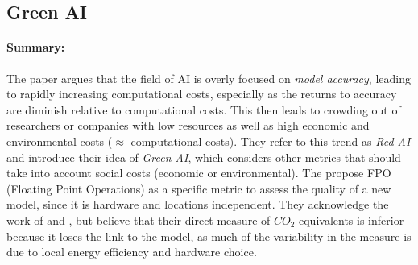 \documentclass[a4paper, 12pt]{article}
\begin{document}
\subsection{Green AI}
\centerline{}
\vspace{1em}

\paragraph{Summary:} The paper argues that the field of AI is overly focused on
\emph{model accuracy}, leading to rapidly increasing computational costs, especially as
the returns to accuracy are diminish relative to computational costs. This then leads to
crowding out of researchers or companies with low resources as well as high economic and
environmental costs ($\approx$ computational costs). They refer to this trend as
\emph{Red AI} and introduce their idea of \emph{Green AI}, which considers other metrics
that should take into account social costs (economic or environmental). The propose FPO
(Floating Point Operations) as a specific metric to assess the quality of a new model,
since it is hardware and locations independent. They acknowledge the work of
 and , but believe that their direct measure
of $CO_2$ equivalents is inferior because it loses the link to the model, as much of the
variability in the measure is due to local energy efficiency and hardware choice.


\nocite{*}
\printbibliography[heading=bibintoc, title={Bibliography}]
\end{document}
